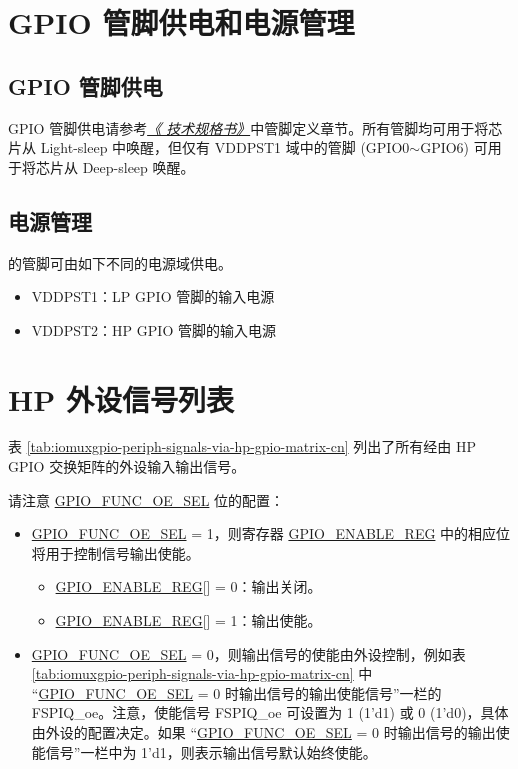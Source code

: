 \documentclass[main\_\_CN.tex]{subfiles}
\begin{document}
\section{GPIO 管脚供电和电源管理}

\subsection{GPIO 管脚供电}
GPIO 管脚供电请参考\textit{\href{https://www.espressif.com/sites/default/files/documentation/esp32-c61_datasheet_en.pdf}{《\chipname{} 技术规格书》}}中管脚定义章节。所有管脚均可用于将芯片从 Light-sleep 中唤醒，但仅有 VDDPST1 域中的管脚 (GPIO0$\sim$GPIO6) 可用于将芯片从 Deep-sleep 唤醒。

\subsection{电源管理}

 \chipname{} 的管脚可由如下不同的电源域供电。

\begin{itemize}
    \item VDDPST1：LP GPIO 管脚的输入电源
    \item VDDPST2：HP GPIO 管脚的输入电源
\end{itemize}

\section{HP 外设信号列表}

表 \ref{tab:iomuxgpio-periph-signals-via-hp-gpio-matrix-cn} 列出了所有经由 HP GPIO 交换矩阵的外设输入输出信号。

请注意 \hyperref[fielddesc:GPIOFUNCNOESEL]{GPIO\_FUNC\_OE\_SEL} 位的配置：

\begin{itemize}
    \item \hyperref[fielddesc:GPIOFUNCNOESEL]{GPIO\_FUNC\_OE\_SEL} = 1，则寄存器 \hyperref[regdesc:GPIOENABLEREG]{GPIO\_ENABLE\_REG} 中的相应位  将用于控制信号输出使能。

    \begin{itemize}
        \item \hyperref[regdesc:GPIOENABLEREG]{GPIO\_ENABLE\_REG}[] = 0：输出关闭。
        \item \hyperref[regdesc:GPIOENABLEREG]{GPIO\_ENABLE\_REG}[] = 1：输出使能。
    \end{itemize}
    \item \hyperref[fielddesc:GPIOFUNCNOESEL]{GPIO\_FUNC\_OE\_SEL} = 0，则输出信号的使能由外设控制，例如表 \ref{tab:iomuxgpio-periph-signals-via-hp-gpio-matrix-cn} 中 “\hyperref[fielddesc:GPIOFUNCNOESEL]{GPIO\_FUNC\_OE\_SEL} = 0 时输出信号的输出使能信号”一栏的 FSPIQ\_oe。注意，使能信号 FSPIQ\_oe 可设置为 1 (1'd1) 或 0 (1'd0)，具体由外设的配置决定。如果 “\hyperref[fielddesc:GPIOFUNCNOESEL]{GPIO\_FUNC\_OE\_SEL} = 0 时输出信号的输出使能信号”一栏中为 1'd1，则表示输出信号默认始终使能。
\end{itemize}
\end{document}
